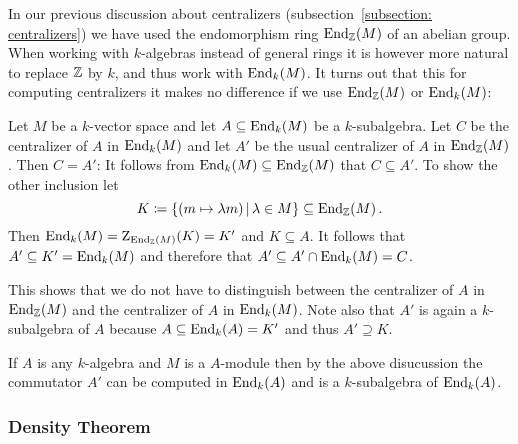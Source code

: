 \begin{fluff}
  In our previous discussion about centralizers (subsection~\ref{subsection: centralizers}) we have used the endomorphism ring $\operatorname{End}_{\mathbb{Z}}(M)$ of an abelian group.
  When working with $k$-algebras instead of general rings it is however more natural to replace $\mathbb{Z}$ by $k$, and thus work with $\operatorname{End}_k(M)$.
  It turns out that this for computing centralizers it makes no difference if we use $\operatorname{End}_{\mathbb{Z}}(M)$ or $\operatorname{End}_k(M)$:
  
  Let $M$ be a $k$-vector space and let $A \subseteq \operatorname{End}_k(M)$ be a $k$-subalgebra.
  Let $C$ be the centralizer of $A$ in $\operatorname{End}_k(M)$ and let $A'$ be the usual centralizer of $A$ in $\operatorname{End}_{\mathbb{Z}}(M)$.
  Then $C = A'$:
  It follows from $\operatorname{End}_k(M) \subseteq \operatorname{End}_{\mathbb{Z}}(M)$ that $C \subseteq A'$.
  To show the other inclusion let
  \[
              K
    \defined  \{ (m \mapsto \lambda m) \suchthat \lambda \in M \}
    \subseteq \End_\Integer(M) \,.
  \]
  Then $\operatorname{End}_k(M) = \operatorname{Z}_{\operatorname{End}_{\mathbb{Z}}(M)}(K) = K'$ and $K \subseteq A$.
  It follows that $A' \subseteq K' = \operatorname{End}_k(M)$ and therefore that $A' \subseteq A' \cap \operatorname{End}_k(M) = C$.
  
  This shows that we do not have to distinguish between the centralizer of $A$ in $\operatorname{End}_{\mathbb{Z}}(M)$ and the centralizer of $A$ in $\operatorname{End}_k(M)$.
  Note also that $A'$ is again a $k$-subalgebra of $A$ because $A \subseteq \operatorname{End}_k(A) = K'$ and thus $A' \supseteq K$.
  
  If $A$ is any $k$-algebra and $M$ is a $A$-module then by the above disucussion the commutator $A'$ can be computed in $\operatorname{End}_k(A)$ and is a $k$-subalgebra of $\operatorname{End}_k(A)$.
\end{fluff}





\subsubsection{Density Theorem}


